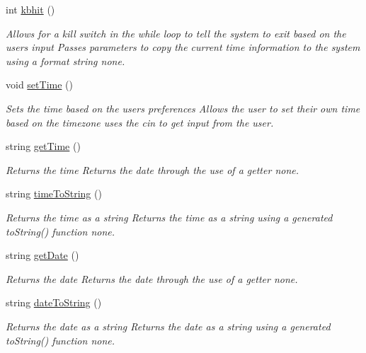 \begin{DoxyCompactItemize}
int \mbox{\hyperlink{class_time_date_widget_a52e79b18c5d46d77a0bc1a198ebcec40}{kbhit}} ()
\begin{DoxyCompactList}\small\item\em Allows for a kill switch in the while loop to tell the system to exit based on the user\textquotesingle{}s input  Passes parameters to copy the current time information to the system using a format string  none. \end{DoxyCompactList}\item 
void \mbox{\hyperlink{class_time_date_widget_abe51a4c778e6351c171067a4706d01d1}{set\+Time}} ()
\begin{DoxyCompactList}\small\item\em Sets the time based on the user\textquotesingle{}s preferences  Allows the user to set their own time based on the timezone  uses the cin to get input from the user. \end{DoxyCompactList}\item 
string \mbox{\hyperlink{class_time_date_widget_a63a3ea239ff728c0dbf3c0ca2caa5be5}{get\+Time}} ()
\begin{DoxyCompactList}\small\item\em Returns the time  Returns the date through the use of a getter  none. \end{DoxyCompactList}\item 
string \mbox{\hyperlink{class_time_date_widget_ae492dd2f58b16b38decd4f4602b08dea}{time\+To\+String}} ()
\begin{DoxyCompactList}\small\item\em Returns the time as a string  Returns the time as a string using a generated to\+String() function  none. \end{DoxyCompactList}\item 
string \mbox{\hyperlink{class_time_date_widget_ac35ae151576ef382ca6ae7d8011357cf}{get\+Date}} ()
\begin{DoxyCompactList}\small\item\em Returns the date  Returns the date through the use of a getter  none. \end{DoxyCompactList}\item 
string \mbox{\hyperlink{class_time_date_widget_ad904a60e864d47cde0ab456d47b2cd15}{date\+To\+String}} ()
\begin{DoxyCompactList}\small\item\em Returns the date as a string  Returns the date as a string using a generated to\+String() function  none. \end{DoxyCompactList}\end{DoxyCompactItemize}


